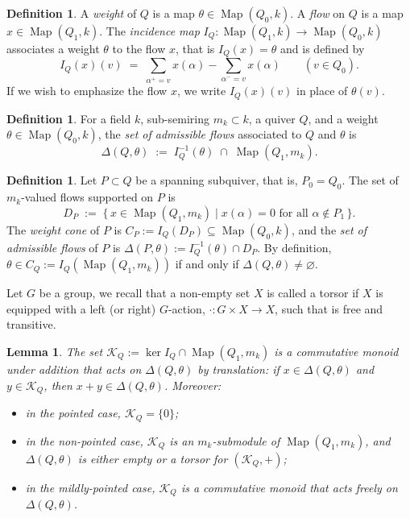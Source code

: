 \documentclass[12pt]{amsart}
\theoremstyle{plain}
\newtheorem{lemma}[theorem]{Lemma}
\theoremstyle{definition}
\newtheorem{definition}[theorem]{Definition}
\DeclareMathOperator{\map}{Map}
\begin{document}
\begin{definition}
A \emph{weight} of $Q$ is a map $\theta \in \map(Q_0, k)$. A \emph{flow} on $Q$ is a map $x \in \map(Q_1, k)$. The \emph{incidence map} $I_Q : \map(Q_1, k) \longrightarrow \map(Q_0, k)$ associates a weight $\theta$ to the flow $x$, 
that is $I_Q(x) = \theta$ and is defined by
\[
I_Q(x)(v) \;=\; \sum_{\alpha^+ = v} x(\alpha) - \sum_{\alpha^- = v} x(\alpha) \qquad (v \in Q_0).
\]
If we wish to emphasize the flow $x$, we write $I_Q(x)(v)$ in place of $\theta(v)$.
\end{definition}

\begin{definition}
For a field $k$, sub-semiring $m_k \subset k$, a quiver $Q$, and a weight $\theta \in \map(Q_0, k)$, the \emph{set of admissible flows} associated to $Q$ and $\theta$ is
\[
\Delta(Q, \theta) \;:=\; I_Q^{-1}(\theta) \;\cap\; \map(Q_1, m_k).
\]
\end{definition}

\begin{definition}
Let $P \subset Q$ be a spanning subquiver, that is, $P_0 = Q_0$. The set of $m_k$-valued flows supported on $P$ is
\[
D_P \;:=\; \bigl\{\, x \in \map(Q_1, m_k) \;\big|\; x(\alpha) = 0 \text{ for all } \alpha \notin P_1 \,\bigr\}.
\]
The \emph{weight cone} of $P$ is $C_P := I_Q(D_P) \subseteq \map(Q_0, k)$, and the \emph{set of admissible flows} of $P$ is $\Delta(P, \theta) := I_Q^{-1}(\theta) \cap D_P$.
By definition, $\theta \in C_Q := I_Q(\map(Q_1, m_k))$ if and only if $\Delta(Q, \theta) \neq \varnothing$.
\end{definition}

Let $G$ be a group, we recall that a non-empty set $X$ is called a torsor if $X$ is equipped with a left (or right) $G$-action, $\cdot: G \times X \to X$, such that is free and transitive. 

\begin{lemma}\label{lem:translation}
The set $\mathcal{K}_Q := \ker I_Q \cap \map(Q_1, m_k)$ is a commutative monoid
under addition that acts on $\Delta(Q,\theta)$ by translation: if
$x \in \Delta(Q,\theta)$ and $y \in \mathcal{K}_Q$, then
$x + y \in \Delta(Q,\theta)$. Moreover:
\begin{itemize}
\item[(i)] in the pointed case, $\mathcal{K}_Q = \{0\}$;
\item[(ii)] in the non-pointed case, $\mathcal{K}_Q$ is an $m_k$-submodule of
$\map(Q_1, m_k)$, and $\Delta(Q,\theta)$ is either empty or a torsor for
$(\mathcal{K}_Q,+)$;
\item[(iii)] in the mildly-pointed case, $\mathcal{K}_Q$ is a commutative monoid
that acts freely on $\Delta(Q,\theta)$.
\end{itemize}
\end{lemma}
\end{document}
